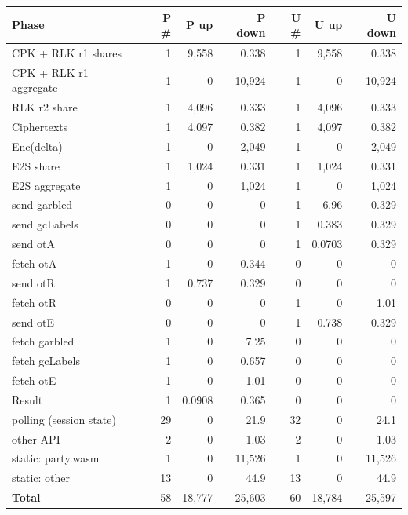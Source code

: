 \begin{tabular}{lrrrrrr}
\hline
Phase & P \# & P up & P down & U \# & U up & U down \\
\hline
CPK + RLK r1 shares & 1 & 9,558 & 0.338 & 1 & 9,558 & 0.338 \\
CPK + RLK r1 aggregate & 1 & 0 & 10,924 & 1 & 0 & 10,924 \\
RLK r2 share & 1 & 4,096 & 0.333 & 1 & 4,096 & 0.333 \\
Ciphertexts & 1 & 4,097 & 0.382 & 1 & 4,097 & 0.382 \\
Enc(delta) & 1 & 0 & 2,049 & 1 & 0 & 2,049 \\
E2S share & 1 & 1,024 & 0.331 & 1 & 1,024 & 0.331 \\
E2S aggregate & 1 & 0 & 1,024 & 1 & 0 & 1,024 \\
send garbled & 0 & 0 & 0 & 1 & 6.96 & 0.329 \\
send gcLabels & 0 & 0 & 0 & 1 & 0.383 & 0.329 \\
send otA & 0 & 0 & 0 & 1 & 0.0703 & 0.329 \\
fetch otA & 1 & 0 & 0.344 & 0 & 0 & 0 \\
send otR & 1 & 0.737 & 0.329 & 0 & 0 & 0 \\
fetch otR & 0 & 0 & 0 & 1 & 0 & 1.01 \\
send otE & 0 & 0 & 0 & 1 & 0.738 & 0.329 \\
fetch garbled & 1 & 0 & 7.25 & 0 & 0 & 0 \\
fetch gcLabels & 1 & 0 & 0.657 & 0 & 0 & 0 \\
fetch otE & 1 & 0 & 1.01 & 0 & 0 & 0 \\
Result & 1 & 0.0908 & 0.365 & 0 & 0 & 0 \\
polling (session state) & 29 & 0 & 21.9 & 32 & 0 & 24.1 \\
other API & 2 & 0 & 1.03 & 2 & 0 & 1.03 \\
static: party.wasm & 1 & 0 & 11,526 & 1 & 0 & 11,526 \\
static: other & 13 & 0 & 44.9 & 13 & 0 & 44.9 \\
\textbf{Total} & 58 & 18,777 & 25,603 & 60 & 18,784 & 25,597 \\
\hline
\end{tabular}

